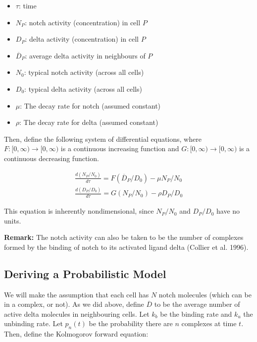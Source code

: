 \documentclass{article}
\begin{document}
\begin{flushleft}
\begin{itemize}
  \item $\tau$: time
  \item $N_{P}$: notch activity (concentration) in cell $P$
  \item $D_{P}$: delta activity (concentration) in cell $P$
  \item $\overline{D}_{P}$: average delta activity in neighbours of $P$
  \item $N_{0}$: typical notch activity (across all cells)
  \item $D_{0}$: typical delta activity (across all cells)
  \item $\mu$: The decay rate for notch (assumed constant)
  \item $\rho$: The decay rate for delta (assumed constant)
\end{itemize}

Then, define the following system of differential equations, where $F:[0, \infty) \rightarrow [0, \infty)$ is a continuous increasing function and $G: [0, \infty)\rightarrow [0, \infty)$ is a continuous decreasing function.

$$
\begin{aligned}
  \frac{d(N_{P} / N_{0})}{d\tau} = F(\overline{D}_{P} / D_{0}) - \mu N_{P} / N_{0} \\[5pt]
  \frac{d(D_{P} / D_{0})}{d\tau} = G(N_{P} / N_{0}) - \rho D_{P} / D_{0}
\end{aligned}
$$

This equation is inherently nondimensional, since $N_{P} / N_{0}$ and $D_{P} / D_{0}$ have no units.

\medskip

\textbf{Remark:} The notch activity can also be taken to be the number of complexes formed by the binding of notch to its activated ligand delta (Collier et al. 1996).

\newpage

\subsection{Deriving a Probabilistic Model}

We will make the assumption that each cell has $N$ notch molecules (which can be in a complex, or not). As we did above, define $\overline{D}$ to be the average number of active delta molecules in neighbouring cells. Let $k_{b}$ be the binding rate and $k_{u}$ the unbinding rate. Let $p_{n}(t)$ be the probability there are $n$ complexes at time $t$. Then, define the Kolmogorov forward equation:


\end{flushleft}
\end{document}
